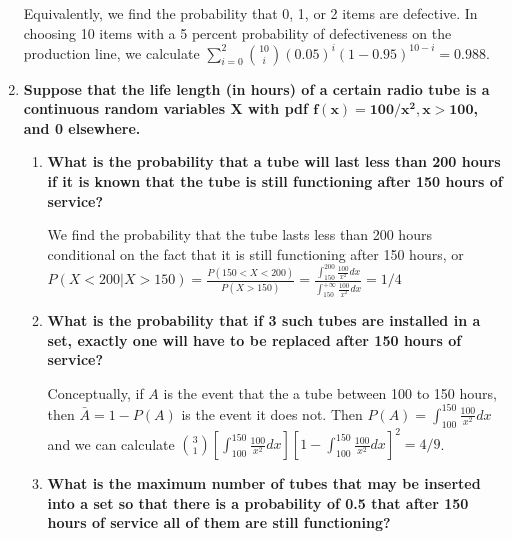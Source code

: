 \documentclass[10pt, oneside]{article}   	%
\theoremstyle{definition}
\begin{document}
\begin{enumerate}[label=4.\arabic*]
Equivalently, we find the probability that 0, 1, or 2 items are defective. In choosing 10 items with a 5 percent probability of defectiveness on the production line, we calculate $\sum^2_{i=0} \binom{10}{i} (0.05)^i (1-0.95)^{10-i} = \boxed{0.988}$.

\item  \begin{tcolorbox}[
  colback=Cerulean!5!white,
  colframe=Cerulean!75!black]
\textbf{Suppose that the life length (in hours) of a certain radio tube is a continuous random variables $\bm{X}$ with pdf $\bm{f(x) = 100/x^2, x > 100}$, and 0 elsewhere.}
\end{tcolorbox}

	\begin{enumerate}
	\item  \begin{tcolorbox}[
	  colback=Cerulean!5!white,
	  colframe=Cerulean!75!black]
	\textbf{What is the probability that a tube will last less than 200 hours if it is known that the tube is still functioning after 150 hours of service?}
	\end{tcolorbox}
	
	We find the probability that the tube lasts less than 200 hours conditional on the fact that it is still functioning after 150 hours, or $P(X < 200 | X > 150) = \frac{P(150 < X < 200)}{P(X > 150)} = \frac{\int^{200}_{150} \frac{100}{x^2} dx }{\int^{+\infty}_{150} \frac{100}{x^2} dx} = \boxed{1/4}$
	
	\item  \begin{tcolorbox}[
	  colback=Cerulean!5!white,
	  colframe=Cerulean!75!black]
	\textbf{What is the probability that if 3 such tubes are installed in a set, exactly one will have to be replaced after 150 hours of service?}
	\end{tcolorbox}
	
	Conceptually, if $A$ is the event that the a tube between 100 to 150 hours, then $\bar{A} = 1 - P(A)$ is the event it does not. Then $P(A) = \int^{150}_{100} \frac{100}{x^2}dx$ and we can calculate $\binom{3}{1} [\int^{150}_{100} \frac{100}{x^2} dx] [1 - \int^{150}_{100} \frac{100}{x^2} dx]^2 = \boxed{4/9}$.
	
	\item  \begin{tcolorbox}[
	  colback=Cerulean!5!white,
	  colframe=Cerulean!75!black]
	\textbf{What is the maximum number of tubes that may be inserted into a set so that there is a probability of 0.5 that after 150 hours of service all of them are still functioning?}
	\end{tcolorbox}
	

\end{enumerate}
\end{enumerate}
\end{document}
